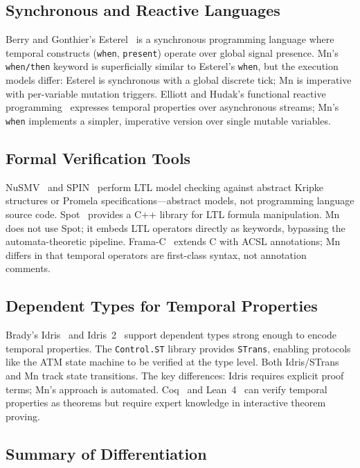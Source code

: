 \documentclass[11pt,a4paper]{article}
\begin{document}
\subsection{Synchronous and Reactive Languages}

Berry and Gonthier's Esterel~\cite{berry1992} is a synchronous programming language where
temporal constructs (\texttt{when}, \texttt{present}) operate over global signal presence.
Mn's \texttt{when/then} keyword is superficially similar to Esterel's \texttt{when}, but the
execution models differ: Esterel is synchronous with a global discrete tick; Mn is imperative
with per-variable mutation triggers. Elliott and Hudak's functional reactive
programming~\cite{elliott1997} expresses temporal properties over asynchronous streams; Mn's
\texttt{when} implements a simpler, imperative version over single mutable variables.

\subsection{Formal Verification Tools}

NuSMV~\cite{cimatti2002} and SPIN~\cite{holzmann2004} perform LTL model checking against
abstract Kripke structures or Promela specifications---abstract models, not programming language
source code. Spot~\cite{duret2016} provides a C++ library for LTL formula manipulation. Mn
does not use Spot; it embeds LTL operators directly as keywords, bypassing the
automata-theoretic pipeline. Frama-C~\cite{cuoq2012} extends C with ACSL annotations; Mn
differs in that temporal operators are first-class syntax, not annotation comments.

\subsection{Dependent Types for Temporal Properties}

Brady's Idris~\cite{brady2013} and Idris~2~\cite{brady2021} support dependent types strong
enough to encode temporal properties. The \texttt{Control.ST} library provides
\texttt{STrans}, enabling protocols like the ATM state machine to be verified at the type level.
Both Idris/STrans and Mn track state transitions. The key differences: Idris requires explicit
proof terms; Mn's approach is automated. Coq~\cite{coquand1988} and Lean~4~\cite{demoura2021}
can verify temporal properties as theorems but require expert knowledge in interactive theorem
proving.

\subsection{Summary of Differentiation}
\end{document}
